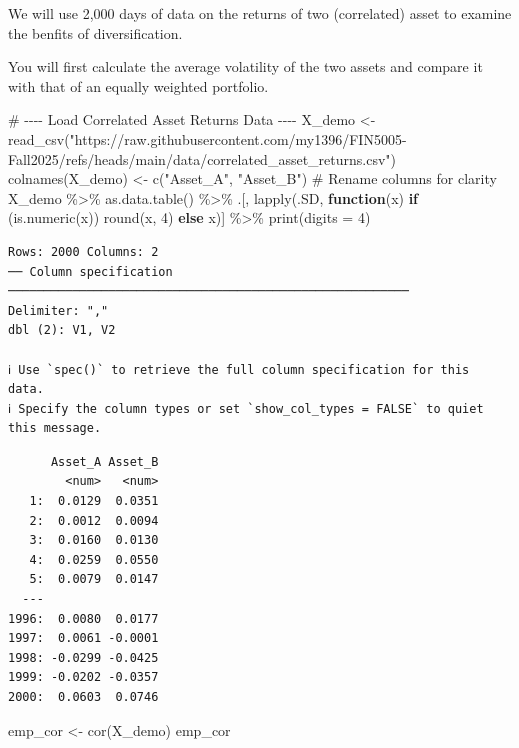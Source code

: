 \documentclass[
  12pt,
  a4paper,
]{scrbook}
\newenvironment{Shaded}{\begin{snugshade}}{\end{snugshade}}
\newcommand{\AttributeTok}[1]{\textcolor[rgb]{0.40,0.45,0.13}{#1}}
\newcommand{\CommentTok}[1]{\textcolor[rgb]{0.37,0.37,0.37}{#1}}
\newcommand{\ControlFlowTok}[1]{\textcolor[rgb]{0.00,0.23,0.31}{\textbf{#1}}}
\newcommand{\DecValTok}[1]{\textcolor[rgb]{0.68,0.00,0.00}{#1}}
\newcommand{\FunctionTok}[1]{\textcolor[rgb]{0.28,0.35,0.67}{#1}}
\newcommand{\NormalTok}[1]{\textcolor[rgb]{0.00,0.23,0.31}{#1}}
\newcommand{\OtherTok}[1]{\textcolor[rgb]{0.00,0.23,0.31}{#1}}
\newcommand{\SpecialCharTok}[1]{\textcolor[rgb]{0.37,0.37,0.37}{#1}}
\newcommand{\StringTok}[1]{\textcolor[rgb]{0.13,0.47,0.30}{#1}}
\theoremstyle{plain}
\theoremstyle{definition}
\theoremstyle{remark}
\begin{document}
We will use 2,000 days of data on the returns of two (correlated) asset
to examine the benfits of diversification.

You will first calculate the average volatility of the two assets and
compare it with that of an equally weighted portfolio.

\begin{Shaded}
\begin{Highlighting}[]
\CommentTok{\# {-}{-}{-}{-} Load Correlated Asset Returns Data {-}{-}{-}{-}}
\NormalTok{X\_demo }\OtherTok{\textless{}{-}} \FunctionTok{read\_csv}\NormalTok{(}\StringTok{"https://raw.githubusercontent.com/my1396/FIN5005{-}Fall2025/refs/heads/main/data/correlated\_asset\_returns.csv"}\NormalTok{)}
\FunctionTok{colnames}\NormalTok{(X\_demo) }\OtherTok{\textless{}{-}} \FunctionTok{c}\NormalTok{(}\StringTok{"Asset\_A"}\NormalTok{, }\StringTok{"Asset\_B"}\NormalTok{)  }\CommentTok{\# Rename columns for clarity}
\NormalTok{X\_demo }\SpecialCharTok{\%\textgreater{}\%}
    \FunctionTok{as.data.table}\NormalTok{() }\SpecialCharTok{\%\textgreater{}\%}
\NormalTok{    .[, }\FunctionTok{lapply}\NormalTok{(.SD, }\ControlFlowTok{function}\NormalTok{(x) }\ControlFlowTok{if}\NormalTok{ (}\FunctionTok{is.numeric}\NormalTok{(x)) }\FunctionTok{round}\NormalTok{(x, }\DecValTok{4}\NormalTok{) }\ControlFlowTok{else}\NormalTok{ x)] }\SpecialCharTok{\%\textgreater{}\%}
    \FunctionTok{print}\NormalTok{(}\AttributeTok{digits =} \DecValTok{4}\NormalTok{)}
\end{Highlighting}
\end{Shaded}

\begin{verbatim}
Rows: 2000 Columns: 2
── Column specification ────────────────────────────────────────────────────────
Delimiter: ","
dbl (2): V1, V2

ℹ Use `spec()` to retrieve the full column specification for this data.
ℹ Specify the column types or set `show_col_types = FALSE` to quiet this message.
\end{verbatim}

\begin{verbatim}
      Asset_A Asset_B
        <num>   <num>
   1:  0.0129  0.0351
   2:  0.0012  0.0094
   3:  0.0160  0.0130
   4:  0.0259  0.0550
   5:  0.0079  0.0147
  ---                
1996:  0.0080  0.0177
1997:  0.0061 -0.0001
1998: -0.0299 -0.0425
1999: -0.0202 -0.0357
2000:  0.0603  0.0746
\end{verbatim}

\begin{Shaded}
\begin{Highlighting}[]
\NormalTok{emp\_cor }\OtherTok{\textless{}{-}} \FunctionTok{cor}\NormalTok{(X\_demo)}
\NormalTok{emp\_cor}
\end{Highlighting}
\end{Shaded}
\end{document}
